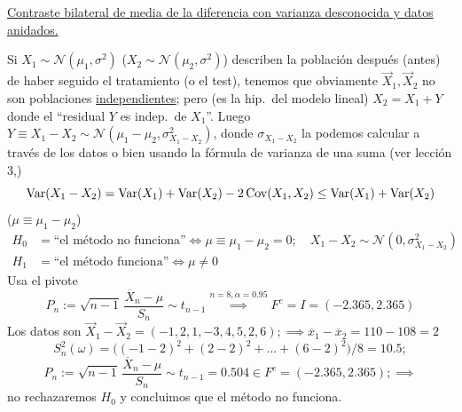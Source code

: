 \begin{enumerate}
\noindent\underline{Contraste bilateral de media de la diferencia con varianza desconocida y datos anidados.}

Si $X_1 \sim \mathcal N(\mu_1, \sigma^2)$ ($X_2 \sim \mathcal N(\mu_2, \sigma^2)$) describen la población después (antes) de haber seguido el tratamiento (o el test), tenemos que obviamente $\vec{X}_1, \vec{X}_2$ no son poblaciones \underline{independientes}; pero (es la hip.\ del modelo lineal) $X_2 = X_1 + Y$ donde el ``residual $Y$ es indep.\ de $X_1$''. Luego $Y \equiv X_1 - X_2 \sim \mathcal N(\mu_1 - \mu_2, \sigma_{X_1 - X_2}^2)$, donde $\sigma_{X_1 - X_2}$ la podemos calcular a través de los datos o bien usando la fórmula de varianza de una suma (ver lección $3$,)
\[
  \operatorname{Var}(X_1 - X_2) = \operatorname{Var}(X_1) + \operatorname{Var}(X_2) - 2\operatorname{Cov}(X_1, X_2) \leq \operatorname{Var}(X_1) + \operatorname{Var}(X_2)
\]
($\mu \equiv \mu_1 - \mu_2$)
\begin{align*}
  H_0 &= \text{``el método no funciona''} \iff \mu \equiv \mu_1 - \mu_2 = 0; \quad X_1 - X_2 \sim \mathcal N(0, \sigma_{X_1 - X_2}^2) \\
  H_1 &= \text{``el método funciona''} \iff \mu \neq 0
\end{align*}
Usa el pivote
\[
  P_n := \sqrt{n-1}\,\frac{\overline{X}_n - \mu}{S_n} \sim t_{n-1} \stackrel{n=8,\alpha=0.95}{\implies} F^c = I = (-2.365, 2.365)
\]
Los datos son $\vec{X}_1 - \vec{X}_2 = (-1, 2, 1, -3, 4, 5, 2, 6); \implies \overline{x}_1 - \overline{x}_2 = 110 - 108 = 2$
\[
  S_n^2(\omega) = \bigl((-1 - 2)^2 + (2 - 2)^2 + \dots + (6 - 2)^2\bigr)/8 = 10.5;
\]
\[
  P_n := \sqrt{n-1}\,\frac{\overline{X}_n - \mu}{S_n} \sim t_{n-1} = 0.504 \in F^c = (-2.365, 2.365); \implies
\]
no rechazaremos $H_0$ y concluimos que el método no funciona.
\end{enumerate}